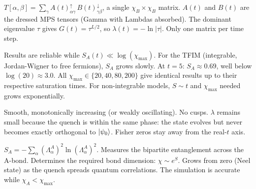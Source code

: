 \documentclass[11pt, a4paper]{article}
\begin{document}
\begin{tcolorbox}[title={Q: Explain the transfer matrix}, colback=blue!5]
$T[\alpha,\beta] = \sum_\gamma A(t)^\uparrow_{\alpha\gamma}\, B(t)^\downarrow_{\gamma\beta}$, a single $\chi_B \times \chi_B$ matrix. $A(t)$ and $B(t)$ are the dressed MPS tensors (Gamma with Lambdas absorbed). The dominant eigenvalue $\tau$ gives $G(t) = \tau^{L/2}$, so $\lambda(t) = -\ln|\tau|$. Only one matrix per time step.
\end{tcolorbox}

\begin{tcolorbox}[title={Q: How does bond dimension $\chi_{\max}$ affect accuracy?}, colback=blue!5]
Results are reliable while $S_A(t) \ll \log(\chi_{\max})$. For the TFIM (integrable, Jordan-Wigner to free fermions), $S_A$ grows slowly. At $t=5$: $S_A \approx 0.69$, well below $\log(20) \approx 3.0$. All $\chi_{\max} \in \{20, 40, 80, 200\}$ give identical results up to their respective saturation times. For non-integrable models, $S \sim t$ and $\chi_{\max}$ needed grows exponentially.
\end{tcolorbox}

\begin{tcolorbox}[title={Q: What would $\lambda(t)$ look like for $h_1 < 1$?}, colback=blue!5]
Smooth, monotonically increasing (or weakly oscillating). No cusps. $\lambda$ remains small because the quench is within the same phase: the state evolves but never becomes exactly orthogonal to $\ket{\psi_0}$. Fisher zeros stay away from the real-$t$ axis.
\end{tcolorbox}

\begin{tcolorbox}[title={Q: What is the entanglement entropy and why does it matter?}, colback=blue!5]
$S_A = -\sum_\alpha (\Lambda^A_\alpha)^2 \ln(\Lambda^A_\alpha)^2$. Measures the bipartite entanglement across the A-bond. Determines the required bond dimension: $\chi \sim e^S$. Grows from zero (Neel state) as the quench spreads quantum correlations. The simulation is accurate while $\chi_A < \chi_{\max}$.
\end{tcolorbox}
\end{document}

